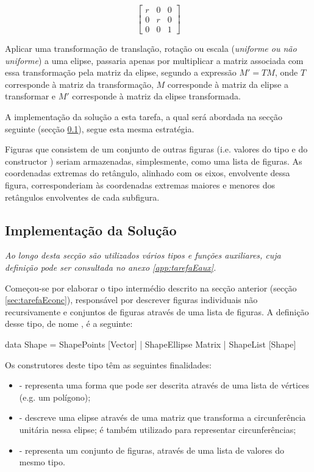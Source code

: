 \documentclass[a4paper]{article}
\begin{document}
\[
\begin{bmatrix}
	r & 0 & 0 \\
	0 & r & 0 \\
	0 & 0 & 1
 \end{bmatrix}
\]

Aplicar uma transformação de translação, rotação ou escala (\emph{uniforme ou não uniforme}) a uma elipse, passaria apenas por multiplicar a matriz associada com essa transformação pela matriz da elipse, segundo a expressão \(M' = TM\), onde \(T\) corresponde à matriz da transformação, \(M\) corresponde à matriz da elipse a transformar e \(M'\) corresponde à matriz da elipse transformada.

A implementação da solução a esta tarefa, a qual será abordada na secção seguinte (secção \ref{sec:tarefaEimpl}), segue esta mesma estratégia.

\bigskip

Figuras que consistem de um conjunto de outras figuras (i.e. valores do tipo  e do constructor ) seriam armazenadas, simplesmente, como uma lista de figuras. As coordenadas extremas do retângulo, alinhado com os eixos, envolvente dessa figura, corresponderiam às coordenadas extremas maiores e menores dos retângulos envolventes de cada subfigura.

\subsection{Implementação da Solução}
\label{sec:tarefaEimpl}

\emph{Ao longo desta secção são utilizados vários tipos e funções auxiliares, cuja definição pode ser consultada no anexo \ref{app:tarefaEaux}.}

\bigskip

Começou-se por elaborar o tipo intermédio descrito na secção anterior (secção \ref{sec:tarefaEconc}), responsável por descrever figuras individuais não recursivamente e conjuntos de figuras através de uma lista de figuras. A definição desse tipo, de nome , é a seguinte:

\begin{haskellblock}
data Shape
    = ShapePoints  [Vector]
    | ShapeEllipse Matrix
    | ShapeList    [Shape]
\end{haskellblock}

Os construtores deste tipo têm as seguintes finalidades:

\begin{itemize}
	\item {} - representa uma forma que pode ser descrita através de uma lista de vértices (e.g. um polígono);
	\item {} - descreve uma elipse através de uma matriz que transforma a circunferência unitária nessa elipse; é também utilizado para representar circunferências;
	\item {} - representa um conjunto de figuras, através de uma lista de valores do mesmo tipo.
\end{itemize}
\end{document}
